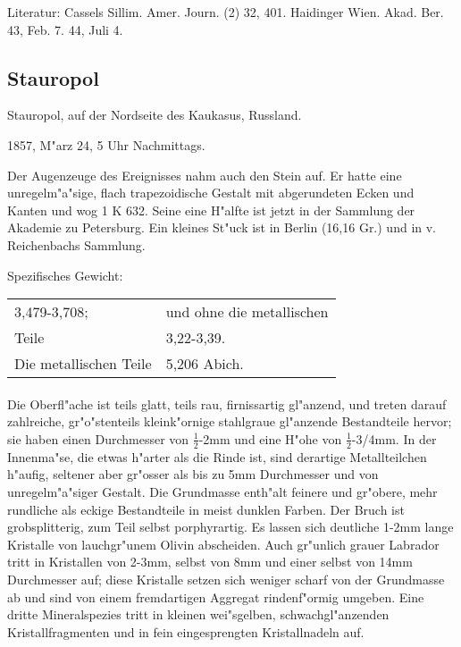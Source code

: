 \documentclass[a4paper, 11pt, oneside]{article}
\begin{document}
Literatur: Cassels Sillim. Amer. Journ. (2) 32, 401. Haidinger Wien. Akad. Ber. 43, Feb. 7. 44, Juli 4.

\subsection{Stauropol}

Stauropol, auf der Nordseite des Kaukasus, Russland.

1857, M"arz 24, 5 Uhr Nachmittags.

Der Augenzeuge des Ereignisses nahm auch den Stein auf. Er hatte eine unregelm"a"sige, flach trapezoidische Gestalt mit abgerundeten Ecken und Kanten und wog 1 K 632. Seine eine H"alfte ist jetzt in der Sammlung der Akademie zu Petersburg. Ein kleines St"uck ist in Berlin (16,16 Gr.) und in v. Reichenbachs Sammlung.

Spezifisches Gewicht:
\begin{table}[!ht]
    \centering
    \begin{tabular}{l l}
        3,479-3,708; & und ohne die metallischen\\
        Teile & 3,22-3,39.\\
        Die metallischen Teile & 5,206 Abich.
    \end{tabular}
\end{table}
\paragraph{}
Die Oberfl"ache ist teils glatt, teils rau, firnissartig gl"anzend, und treten darauf zahlreiche, gr"o"stenteils kleink"ornige stahlgraue gl"anzende Bestandteile hervor; sie haben einen Durchmesser von $\frac{1}{2}$-2mm und eine H"ohe von $\frac{1}{2}$-3/4mm. In der Innenma"se, die etwas h"arter als die Rinde ist, sind derartige Metallteilchen h"aufig, seltener aber gr"osser als bis zu 5mm Durchmesser und von unregelm"a"siger Gestalt. Die Grundmasse enth"alt feinere und gr"obere, mehr rundliche als eckige Bestandteile in meist dunklen Farben. Der Bruch ist grobsplitterig, zum Teil selbst porphyrartig. Es lassen sich deutliche 1-2mm lange Kristalle von lauchgr"unem Olivin abscheiden. Auch gr"unlich grauer Labrador tritt in Kristallen von 2-3mm, selbst von 8mm und einer selbst von 14mm Durchmesser auf; diese Kristalle setzen sich weniger scharf von der Grundmasse ab und sind von einem fremdartigen Aggregat rindenf"ormig umgeben. Eine dritte Mineralspezies tritt in kleinen wei"sgelben, schwachgl"anzenden Kristallfragmenten und in fein eingesprengten Kristallnadeln auf.
\end{document}
